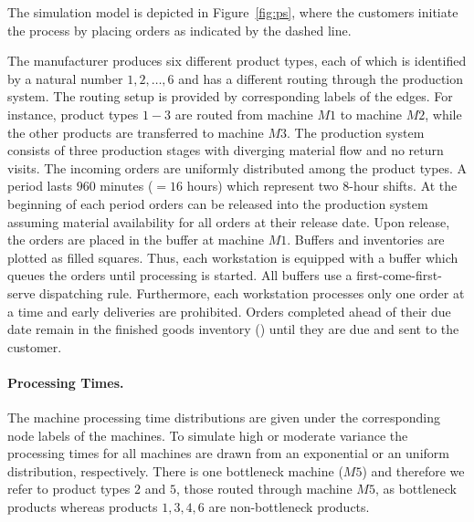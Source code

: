 \documentclass[envcountsame]{llncs}
\begin{document}
The simulation model is depicted in Figure~\ref{fig:ps}, where the customers initiate the process by
placing orders as indicated by the dashed line.
%
\begin{figure*}[t!]
  \centering
  \caption{Production System of the Simulation Model with routing, processing time distributions and
    demand interarrival time distributions.} \label{fig:ps}
\end{figure*}
%
%
The manufacturer produces six different product types, each of which is identified by a natural
number ${1,2,\ldots,6}$ and has a different routing through the production system. The routing setup
is provided by corresponding labels of the edges. For instance, product types $1-3$ are routed from
machine $M1$ to machine $M2$, while the other products are transferred to machine $M3$. The
production system consists of three production stages with diverging material flow and no return
visits.
%
The incoming orders are uniformly distributed among the product types.
%
A period lasts $960$ minutes ($=16$ hours) which represent two \(8\)-hour shifts. At the
beginning of each period orders can be released into the production system assuming material
availability for all orders at their release date. Upon release, the orders are
placed in the buffer at machine $M1$. Buffers and inventories are plotted as filled squares. Thus,
each workstation is equipped with a buffer which queues the orders until processing is started. All
buffers use a first-come-first-serve dispatching rule.
%
Furthermore, each workstation processes only one order at a time and early deliveries are
prohibited. Orders completed ahead of their due date remain in the finished goods inventory (\fgi{})
until they are due and sent to the customer.


\paragraph{Processing Times.} The machine processing time distributions are given under the
corresponding node labels of the machines. To simulate high or moderate variance the processing
times for all machines are  drawn from an exponential or an uniform distribution,
respectively. There is one bottleneck machine ($M5$) and therefore we refer to product
types $2$ and $5$, those routed through machine $M5$, as
bottleneck products whereas products $1,3,4,6$ are non-bottleneck products.
\end{document}
